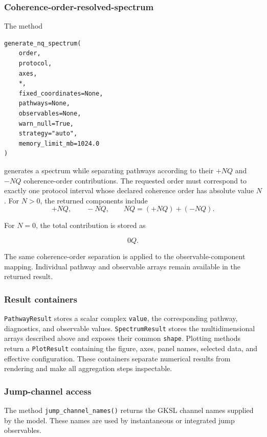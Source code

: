 \documentclass[11pt]{article}
\begin{document}
\subsubsection{Coherence-order-resolved-spectrum}

The method


\begin{verbatim}
generate_nq_spectrum(
    order,
    protocol,
    axes,
    *,
    fixed_coordinates=None,
    pathways=None,
    observables=None,
    warn_null=True,
    strategy="auto",
    memory_limit_mb=1024.0
)
\end{verbatim}

generates a spectrum while separating pathways according to their $+NQ$ and $-NQ$ coherence-order contributions. The requested order must correspond to exactly one protocol interval whose declared coherence order has absolute value $N$. For $N>0$, the returned components include
\begin{equation}
+NQ,\qquad -NQ,\qquad NQ=(+NQ)+(-NQ).
\end{equation}

For \(N=0\), the total contribution is stored as

\begin{equation}
0Q.
\end{equation}

The same coherence-order separation is applied to the observable-component mapping. Individual pathway and observable arrays remain available in the returned result.

\subsubsection{Result containers}

\texttt{PathwayResult} stores a scalar complex \texttt{value}, the corresponding pathway, diagnostics, and observable values. \texttt{SpectrumResult} stores the multidimensional arrays described above and exposes their common \texttt{shape}. Plotting methods return a \texttt{PlotResult} containing the figure, axes, panel names, selected data, and effective configuration. These containers separate numerical results from rendering and make all aggregation steps inspectable.


\subsubsection{Jump-channel access}

The method \texttt{jump\_channel\_names()} returns the GKSL channel names supplied by the model. These names are used by instantaneous or integrated jump observables.
\end{document}
